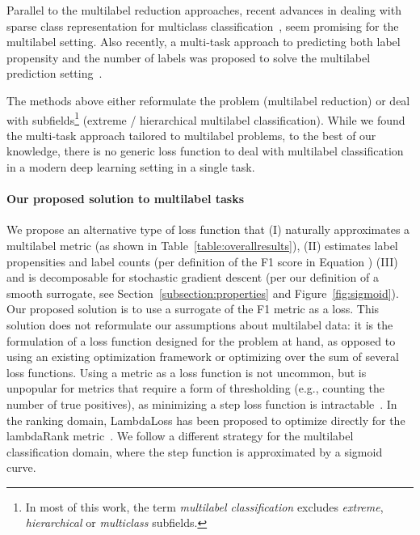 Parallel to the multilabel reduction approaches, recent advances in dealing with sparse class representation for multiclass classification~\citep{focalLoss,tencent}, seem promising for the multilabel setting. Also recently, a multi-task approach to predicting both label propensity and the number of labels was proposed to solve the multilabel prediction setting~\cite{multitaskLabel}.

The methods above either reformulate the problem (multilabel reduction) or deal with subfields\footnote{In most of this work, the term \emph{multilabel classification} excludes \emph{extreme}, \emph{hierarchical} or \emph{multiclass} subfields.} (extreme / hierarchical multilabel classification). While we found the multi-task approach tailored to multilabel problems, to the best of our knowledge, there is no generic loss function to deal with multilabel classification in a modern deep learning setting in a single task.



\paragraph{Our proposed solution to multilabel tasks}
We propose an alternative type of loss function that (I) naturally approximates a multilabel metric (as shown in Table~\ref{table:overallresults}), (II) estimates label propensities and label counts (per definition of the F1 score in Equation ) (III) and is decomposable for stochastic gradient descent (per our definition of a smooth surrogate, see Section~\ref{subsection:properties} and Figure~\ref{fig:sigmoid}). Our proposed solution is to use a surrogate of the F1 metric as a loss. This solution does not reformulate our assumptions about multilabel data: it is the formulation of a loss function designed for the problem at hand, as opposed to using an existing optimization framework or optimizing over the sum of several loss functions.
Using a metric as a loss function is not uncommon, but is unpopular for metrics that require a form of thresholding (e.g., counting the number of true positives), as minimizing a step loss function is intractable~\cite{stochasticNegativeMining}. In the ranking domain, LambdaLoss has been proposed to optimize directly for the lambdaRank metric~\cite{lambdaLoss}. We follow a different strategy for the multilabel classification domain, where the step function is approximated by a sigmoid curve. 

